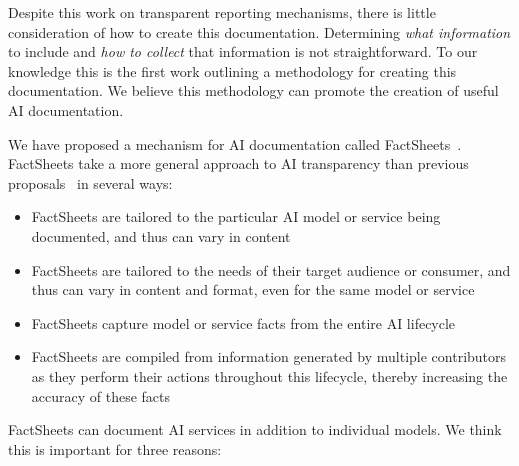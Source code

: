 \documentclass[11pt,dvipdfm]{article}
\begin{document}
Despite this work on transparent reporting mechanisms, there is little consideration of how to create this documentation. 
Determining \emph{what information} to include and \emph{how to collect} that information is not straightforward.
To our knowledge this is the first work outlining a methodology for creating this documentation.
We believe this methodology can promote the creation of useful AI documentation.

We have proposed a mechanism for AI documentation called FactSheets~\cite{factsheets-2019}. FactSheets take a more general approach to AI transparency than previous 
proposals~\cite{gebru-2021,data-statements,HollandHNJC2018,model-cards,EuropeanCommission2020,EuropeanCommission2021}
in several ways:\\

\begin{itemize}[noitemsep,nolistsep]
    \item FactSheets are
tailored to the particular AI model or service being documented, and thus can vary in content 

\item FactSheets are tailored to the needs of their target audience or consumer, and thus can vary in content and format, even for the same model or service

\item FactSheets capture model or service facts from the entire AI lifecycle

\item FactSheets are compiled from information generated by multiple contributors as they perform their actions throughout this lifecycle, thereby increasing the accuracy of these facts
\end{itemize}
\hspace{.2cm}

FactSheets can document AI services in addition to individual models. We think this is important for three reasons:\\
\end{document}
